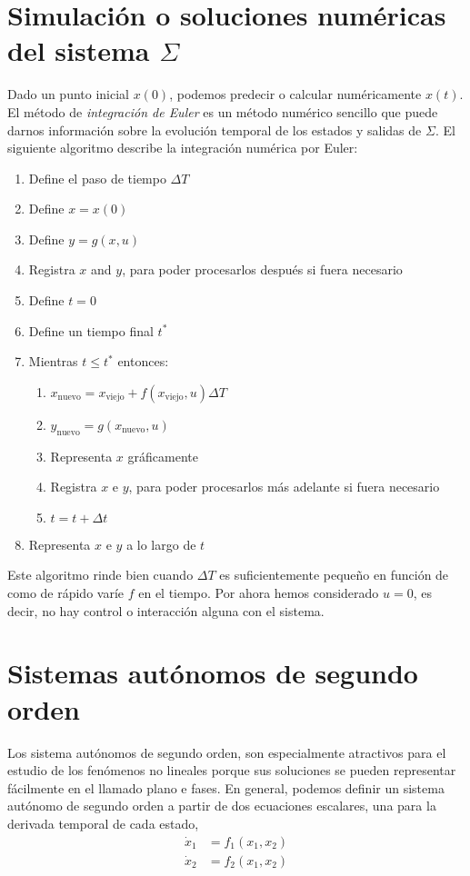 \section{Simulación o soluciones numéricas del sistema $\Sigma$}
Dado un punto inicial $x(0)$, podemos predecir o calcular numéricamente $x(t)$. El método de \emph{integración de Euler} es un método numérico sencillo que puede darnos información sobre la evolución temporal de los estados y salidas de $\Sigma$. El siguiente algoritmo describe la integración numérica por Euler:
\begin{algo}
	\begin{enumerate}
		\item Define el paso de tiempo $\Delta T$
		\item Define $x = x(0)$
		\item Define $y = g(x,u)$
		\item Registra $x$ and $y$, para poder procesarlos después si fuera necesario
		\item Define $t = 0$
		\item Define un tiempo final $t^*$
		\item Mientras $t \leq t^*$ entonces:
			\begin{enumerate}
				\item $x_{\text{nuevo}} = x_{\text{viejo}} + f(x_{\text{viejo}},u)\Delta T$
				\item $y_{\text{nuevo}} = g(x_{\text{nuevo}},u)$
				\item Representa $x$ gráficamente
				\item Registra $x$ e $y$, para poder procesarlos más adelante si fuera necesario
				\item $t = t + \Delta t$
			\end{enumerate}
		\item Representa $x$ e $y$ a lo largo de $t$
	\end{enumerate}
\end{algo}

Este algoritmo rinde bien cuando $\Delta T$ es suficientemente pequeño en función de como de rápido varíe $f$ en el tiempo. Por ahora hemos considerado $u=0$, es decir, no hay control o interacción alguna con el sistema.

\section{Sistemas autónomos de segundo orden}
Los sistema autónomos de segundo orden, son especialmente atractivos para el estudio de los fenómenos no lineales porque sus soluciones se pueden representar fácilmente en el llamado plano e fases.
En general, podemos definir un sistema autónomo de segundo orden a partir de dos ecuaciones escalares, una para la derivada temporal de cada estado,
\begin{align}
\dot x_1 &= f_1(x_1,x_2) \label{eq: sysa1}\\
\dot x_2 &= f_2(x_1,x_2) \label{eq: sysa2}
\end{align}

